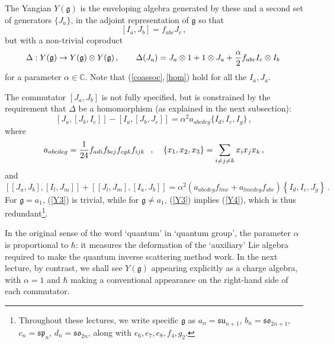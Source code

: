 \documentclass[12pt]{article}
\newcommand{\gf}{\mathfrak{g}}
\begin{document}
The Yangian \cite{drinf1,drinf2} $Y(\gf)$ is the enveloping algebra
generated by these and a second set of generators $\{J_a\}$, in
the adjoint representation of $\gf$ so that \begin{equation}\label{Y2} \left[
I_a , J_b \right] =   f_{abc} J_c \,, \end{equation} but with a non-trivial
coproduct \begin{equation}\label{Y2del} \Delta:Y(\gf)\rightarrow Y(\gf)\otimes
Y(\gf)\,,\qquad \Delta(J_a) = J_a \otimes 1 + 1 \otimes J_a +
{\alpha\over 2}f_{abc} I_c \otimes I_b\, \end{equation} for a parameter
$\alpha\in{\mathbb C}$. Note that (\ref{coassoc},\,\ref{hom}) hold
for all the $I_a,J_a$.

The commutator $[J_{a},J_{b}]$ is not fully specified, but is
constrained by the requirement that $\Delta$ be a homomorphism (as
explained in the next subsection): \begin{equation}\label{Y3}
[J_a,[J_b,I_c]]-[I_a,[J_b,J_c]] = \alpha^2
a_{abcdeg}\{I_d,I_e,I_g\} \,, \end{equation} where \begin{equation}
 a_{abcdeg}={1\over{24}}
 f_{adi} f_{bej}f_{cgk}f_{ijk}
 \hspace{0.1in},\hspace{0.15in}\{x_1,x_2,x_3\}=
 \sum_{i\neq j\neq k}x_{i}x_{j}x_{k} \,,
\end{equation} and \begin{equation}\label{Y4} [[J_a,J_b],[I_l,J_m]] +
[[J_l,J_m],[I_a,J_b]] = \alpha^2 \left( a_{abcdeg}f_{lmc} +
a_{lmcdeg}f_{abc} \right) \left\{ I_d,I_e,J_g \right\} \,. \end{equation} For
$\gf=a_1$,  (\ref{Y3}) is trivial, while for $\gf\neq a_1$,
(\ref{Y3}) implies (\ref{Y4}), which is thus
redundant\footnote{Throughout these lectures, we write specific
$\gf$ as $a_n={\mathfrak{su}}_{n+1}$, $b_n={\mathfrak{so}}_{2n+1}$,
$c_n={\mathfrak{sp}}_n$, $d_n={\mathfrak{so}}_{2n}$, along with
$e_6,e_7,e_8,f_4,g_2$.}.

In the original sense of the word `quantum' in `quantum group',
the parameter $\alpha$ is proportional to $\hbar$: it measures the
deformation of the `auxiliary' Lie algebra required to make the
quantum inverse scattering method work. In the next lecture, by
contrast, we shall see $Y(\gf)$ appearing explicitly as a charge
algebra, with $\alpha=1$ and $\hbar$ making a conventional
appearance on the right-hand side of each commutator.
\end{document}
